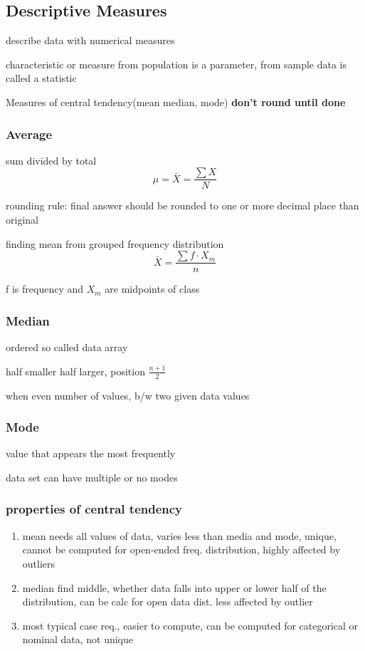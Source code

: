 \documentclass[11pt]{amsart}
\begin{document}
\subsection{Descriptive Measures}
  \par describe data with numerical measures
  \par characteristic or measure from population is a parameter, from sample
  data is called a statistic
  \par Measures of central tendency(mean median, mode)
  \textbf{don't round until done}
  \subsubsection{Average}
  \par sum divided by total
  \begin{equation*}
    \mu = \bar{X} = \frac{\sum{X}}{N}
  \end{equation*}
  \par rounding rule: final answer should be rounded to one or more decimal
  place than original
  \par finding mean from grouped frequency distribution
  \begin{equation}
    \bar{X} = \frac{\sum{f \cdot X_m}}{n}
  \end{equation}
  \par f is frequency and $X_m$ are midpoints of class
  \subsubsection{Median}
  \par ordered so called data array
  \par half smaller half larger, position $\frac{n+1}{2}$
  \par when even number of values, b/w two given data values
  \subsubsection{Mode}
  \par value that appears the most frequently
  \par data set can have multiple or no modes
  \subsubsection{properties of central tendency}
 	\begin{enumerate}
	\item mean needs all values of data, varies less than media and mode, unique, cannot be computed for open-ended freq. distribution, highly affected by outliers
	\item median find middle, whether data falls into upper or lower half of the distribution, can be calc for open data dist. less affected by outlier
	\item most typical case req., easier to compute, can be computed for categorical or nominal data, not unique
	\end{enumerate}
\end{document}
